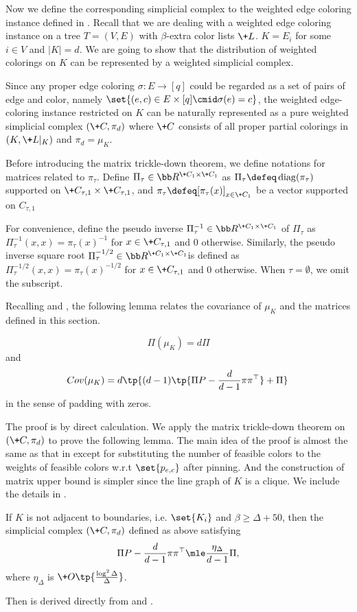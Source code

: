 \documentclass[a4paper,11pt]{article}
\begin{document}
Now we define the corresponding simplicial complex to the weighted edge coloring instance defined in .
Recall that we are dealing with a weighted edge coloring instance on a tree $T=(V, E)$
with $\beta$-extra color lists $\+L$. $K = E_i$ for some $i\in V$ and $|K| = d$.
We are going to show that the distribution of weighted colorings on $K$ can be
represented by a weighted simplicial complex.

Since any proper edge coloring  $\sigma:E\rightarrow [q]$ could be regarded as a set of pairs of edge and color, namely $\set{(e,c)\in E\times [q]\cmid \sigma(e)=c}$, the weighted edge-coloring instance restricted on $K$ can be naturally represented as a pure weighted simplicial complex $(\+C,\pi_{d})$ where $\+C$ consists of all proper partial colorings in $(K,\+L|_K)$ and $\pi_{d}=\mu_K$.

Before introducing the matrix trickle-down theorem, we define notations for matrices related to $\pi_\tau$. Define $\Pi_\tau \in \bb R^{\+C_1\times\+C_1}$ as $\Pi_\tau \defeq \operatorname{diag}(\pi_\tau)$ supported on $\+C_{\tau,1}\times \+C_{\tau,1}$,
and $\pi_\tau\defeq[\pi_\tau(x)]_{x\in \+C_1}$ be a vector supported on $C_{\tau, 1}$

For convenience, define the pseudo inverse $\Pi_\tau^{-1} \in \bb R^{\+C_1\times\+C_1}$ of $\Pi_\tau$ as $\Pi_\tau^{-1}(x,x)=\pi_\tau(x)^{-1}$ for $x\in \+C_{\tau,1}$ and $0$ otherwise. Similarly, the pseudo inverse square root $\Pi_\tau^{-1/2} \in \bb R^{\+C_1\times\+C_1}$is defined as $\Pi_\tau^{-1/2}(x,x)=\pi_\tau(x)^{-1/2}$ for $x\in \+C_{\tau,1}$ and $0$ otherwise. When $\tau=\emptyset$, we omit the subscript.

Recalling  and , 
the following lemma relates the covariance of $\mu_K$ and the matrices defined in this section.
\begin{proposition}\label{lem:mtd-to-si}
    \[
    \Pi(\mu_K)=d\Pi
    \]
    and
    \[
    \!{Cov}(\mu_K) =d \tp{(d-1) \tp{\Pi P -\frac{d}{d-1}\pi \pi^\top} + \Pi}
    \]
    in the sense of padding with zeros.
\end{proposition}
The proof is by direct calculation.
We apply the matrix trickle-down theorem on $(\+C,\pi_d)$ to prove the following lemma. The main idea of the proof is almost the same as that in \cite{WZZ24} except for substituting the number of feasible colors to the weights of feasible colors w.r.t $\set{p_{e,c}}$ after pinning. And the construction of matrix upper bound is simpler since the line graph of $K$ is a clique. We include the details in .
\begin{lemma}\label{lem:PiP-bound}
    If $K$ is not adjacent to boundaries, i.e. $\set{K_i}$ and $\beta \geq \Delta + 50$, then the simplicial complex $(\+C,\pi_d)$ defined as above satisfying
    \[
    \Pi P -\frac{d}{d-1}\pi \pi^\top \mle \frac{\eta_{\Delta}}{d-1} \Pi ,
    \]
    where $\eta_{\Delta}$ is $\+O\tp{\frac{\log^2 \Delta}{\Delta}}$.
\end{lemma}
Then  is derived directly from  and .
\end{document}
